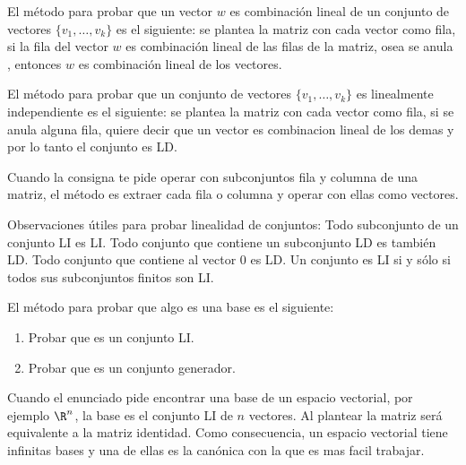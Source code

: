 \documentclass[a4,10pt]{aleph-notas}
\begin{document}
\begin{obs}
    El método para probar que un vector $w$ es combinación lineal de un conjunto de vectores $\{v_1,\ldots,v_k\}$ es el siguiente: se plantea la matriz con cada vector como fila, si la fila del vector $w$ es combinación lineal de las filas de la matriz, osea se anula , entonces $w$ es combinación lineal de los vectores.
\end{obs}

\begin{obs}
    El método para probar que un conjunto de vectores $\{v_1,\ldots,v_k\}$ es linealmente independiente es el siguiente: se plantea la matriz con cada vector como fila, si se anula alguna fila, quiere decir que un vector es combinacion lineal de los demas y por lo tanto el conjunto es LD.
\end{obs}

\begin{obs}
    Cuando la consigna te pide operar con subconjuntos fila y columna de una matriz, el método es extraer cada fila o columna y operar con ellas como vectores.
\end{obs}

\begin{obs}
    Observaciones útiles para probar linealidad de conjuntos: Todo subconjunto de un conjunto LI es LI. Todo conjunto que contiene un subconjunto LD es también LD. Todo conjunto que contiene al vector 0 es LD. Un conjunto es LI si y sólo si todos sus subconjuntos finitos son LI.
\end{obs}

\begin{obs}
    El método para probar que algo es una base es el siguiente:
    \begin{enumerate}
        \item Probar que es un conjunto LI.
        \item Probar que es un conjunto generador.
    \end{enumerate}
\end{obs}

\begin{obs}
    Cuando el enunciado pide encontrar una base de un espacio vectorial, por ejemplo $\R^n$, la base es el conjunto LI de $n$ vectores. Al plantear la matriz será equivalente a la matriz identidad. Como consecuencia, un espacio vectorial tiene infinitas bases y una de ellas es la canónica con la que es mas facil trabajar.
\end{obs}
\end{document}
